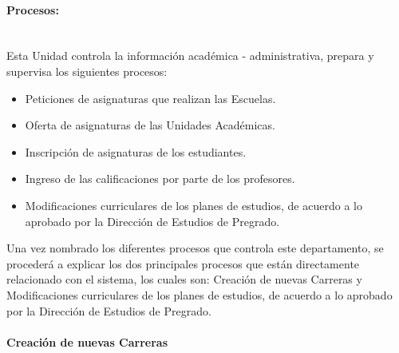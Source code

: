 \documentclass[12pt]{article}
\newcommand{\myparagraph}[1]{\paragraph{#1}\mbox{}\\}
\begin{document}
	



			
			\myparagraph{Procesos:}
			
			Esta Unidad  controla la información académica - administrativa, prepara y supervisa los siguientes procesos:
			\begin{itemize}
				\item Peticiones de asignaturas que realizan las Escuelas.
				\item Oferta de asignaturas de las Unidades Académicas.
				\item Inscripción de asignaturas de los estudiantes.
				\item Ingreso de las calificaciones por parte de los profesores.
				\item Modificaciones curriculares de los planes de estudios, de acuerdo  a lo aprobado por la Dirección de Estudios de Pregrado.
				
			\end{itemize}
			
			
			Una vez nombrado los diferentes procesos que controla este departamento, se procederá a explicar los dos  principales procesos que están directamente relacionado con el sistema, los cuales son: Creación de nuevas Carreras y  Modificaciones curriculares de los planes de estudios, de acuerdo  a lo aprobado por la Dirección de Estudios de Pregrado.

			\myparagraph{Creación de nuevas Carreras}
			
\end{document}
